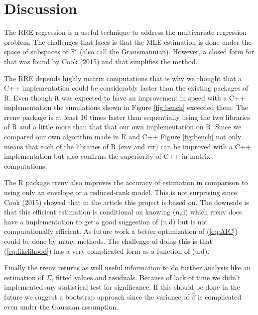 \documentclass[11pt,a4paper]{article}
\begin{document}
\section{Discussion}

The RRE regression is a useful technique to address the multivariate regression problem.
The challenges that faces is that the MLE estimation is done under the space of subspaces of $\mathbb{R}^r$ (also call the Gransmannian).
However, a closed form for that was found by Cook (2015) and that simplifies the method.

The RRE depends highly matrix computations that is why we thought that a C++ implementation could be considerably faster than the existing packages of R. 
Even though it was expected to have an improvement in speed with a C++ implementation the simulations shown in Figure \ref{fig:bench} exceeded them.
The rrenv package is at least 10 times faster than sequentially using the two libraries of R and a little more than that that our own implementation on R.
Since we compared our own algorithm made in R and C++ Figure \ref{fig:bench} not only means that each of the libraries of R (env and rrr) can be improved with a C++ implementation but also confirms the superiority of C++ in matrix computations.

The R package rrenv also improves the accuracy of estimation in comparison to using only  an envelope or a reduced-rank model. 
This is not surprising since Cook (2015) showed that in the article this project is based on.
The downside is that this efficient estimation is conditional on knowing (u,d) which rrenv does have a implementation to get a good suggestion of (u,d) but is not computationally efficient.
As future work a better optimization of (\ref{eq:AIC}) could be done by many methods. 
The challenge of doing this is that (\ref{eq:likelihood}) has a very complicated form as a function of (u,d).

Finally the rrenv returns as well useful information to do further analysis like an estimation of $\Sigma$, fitted values and residuals.
Because of lack of time we didn't implemented any statistical test for significance.
If this should be done in the future we suggest a bootstrap approach since the variance of $\hat{\beta}$ is complicated even under the Gaussian assumption.
\end{document}
